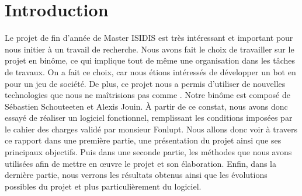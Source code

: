\section{Introduction}
Le projet de fin d'année de Master ISIDIS est très intéressant et important pour nous initier à un travail de recherche.
Nous avons fait le choix de travailler sur le projet \himalaya en binôme, ce qui implique tout de même une organisation dans les tâches de travaux.
On a fait ce choix, car nous étions intéressés de développer un bot en \java pour un jeu de société.
De plus, ce projet nous a permis d’utiliser de nouvelles technologies que nous ne maîtrisions pas comme \fx.
Notre binôme est composé de Sébastien Schouteeten et Alexis Jouin.
À partir de ce constat, nous avons donc essayé de réaliser un logiciel fonctionnel, remplissant les conditions imposées par le cahier des charges validé par monsieur Fonlupt. Nous allons donc voir à travers ce rapport dans une première partie, une présentation du projet ainsi que ses principaux objectifs. Puis dans une seconde partie, les méthodes que nous avons utilisées afin de mettre en \oe uvre le projet et son élaboration. Enfin, dans la dernière partie, nous verrons les résultats obtenus ainsi que les évolutions possibles du projet et plus particulièrement du logiciel.